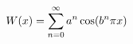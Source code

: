 \documentclass[preview]{standalone}
\begin{document}
\begin{align*}
\special{dvisvgm:raw <g id='unique000'>}W(x)=\sum_{n=0}^{\infty} a^n\cos(b^n\pi x)\special{dvisvgm:raw </g>}
\end{align*}
\end{document}
